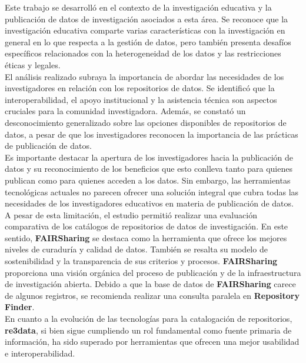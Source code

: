 \documentclass[runningheads]{llncs}
\begin{document}
Este trabajo se desarrolló en el contexto de la investigación educativa y la publicación de datos de investigación asociados a esta área. Se reconoce que la investigación educativa comparte varias características con la investigación en general en lo que respecta a la gestión de datos, pero también presenta desafíos específicos relacionados con la heterogeneidad de los datos y las restricciones éticas y legales.\\

El análisis realizado subraya la importancia de abordar las necesidades de los investigadores en relación con los repositorios de datos. Se identificó que la interoperabilidad, el apoyo institucional y la asistencia técnica son aspectos cruciales para la comunidad investigadora. Además, se constató un desconocimiento generalizado sobre las opciones disponibles de repositorios de datos, a pesar de que los investigadores reconocen la importancia de las prácticas de publicación de datos.\\

Es importante destacar la apertura de los investigadores hacia la publicación de datos y su reconocimiento de los beneficios que esto conlleva tanto para quienes publican como para quienes acceden a los datos. Sin embargo, las herramientas tecnológicas actuales no parecen ofrecer una solución integral que cubra todas las necesidades de los investigadores educativos en materia de publicación de datos.\\

A pesar de esta limitación, el estudio permitió realizar una evaluación comparativa de los catálogos de repositorios de datos de investigación. En este sentido, \textbf{FAIRSharing} se destaca como la herramienta que ofrece los mejores niveles de curaduría y calidad de datos. También se resalta su modelo de sostenibilidad y la transparencia de sus criterios y procesos. \textbf{FAIRSharing} proporciona una visión orgánica del proceso de publicación y de la infraestructura de investigación abierta. Debido a que la base de datos de \textbf{FAIRSharing} carece de algunos registros, se recomienda realizar una consulta paralela en \textbf{Repository Finder}.\\

En cuanto a la evolución de las tecnologías para la catalogación de repositorios, \textbf{re3data}, si bien sigue cumpliendo un rol fundamental como fuente primaria de información, ha sido superado por herramientas que ofrecen una mejor usabilidad e interoperabilidad.\\
\end{document}
